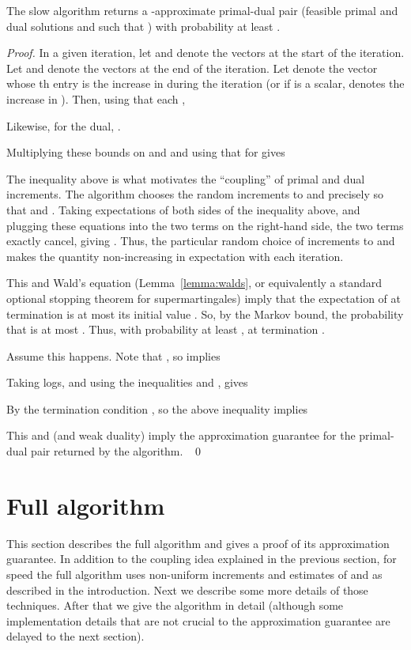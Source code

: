 \documentclass[11pt]{svjour3} \usepackage{fullpage}
\newenvironment{Proof}{\begin{proof}}{{} ~\hfill\hfill\qed~\end{proof}}
\begin{document}
\begin{lemma}\label{lemma:slowalg}
The slow algorithm returns a -approximate primal-dual pair (feasible primal and dual solutions  and  such that ) with probability at least .
\end{lemma}
\begin{Proof}
In a given iteration, let  and  denote the vectors at the start of the iteration.  
Let  and  denote the vectors at the end of the iteration.  
Let  denote the vector whose th entry is the increase in  during the iteration
(or if  is a scalar,  denotes the increase in ).  
Then, using that each ,

Likewise, for the dual,
.

\smallskip
Multiplying these bounds on  and 
and using that  for  gives


The inequality above is what motivates the ``coupling'' of primal and dual increments.
The algorithm chooses the random increments to  and 
precisely so that 
and .
Taking expectations of both sides of the inequality above,
and plugging these equations into the two terms on the right-hand side,
the two terms exactly cancel,
giving .
Thus, the particular random choice of increments to  and 
makes the quantity  non-increasing in expectation
with each iteration.

This and Wald's equation (Lemma~\ref{lemma:walds}, or equivalently a standard optional stopping theorem for supermartingales) imply that the expectation of  at termination is at most its initial value .
So, by the Markov bound, the probability 
that  is at most .
Thus, with probability at least ,
at termination .

Assume this happens.
Note that  ,
so  implies

Taking logs, and using the inequalities 
and , gives


By the termination condition , so the above inequality implies


This and   (and weak duality) imply the approximation guarantee
for the primal-dual pair  returned by the algorithm.
\end{Proof}


\section{Full algorithm}
This section describes the full algorithm 
and gives a proof of its approximation guarantee.
In addition to the coupling idea explained in the previous section,
for speed
the full algorithm uses non-uniform increments
and estimates of  and  as described in the introduction.
Next we describe some more details of those techniques.
After that we give the algorithm in detail
(although some implementation details that are not crucial to the approximation guarantee
are delayed to the next section).
\end{document}

